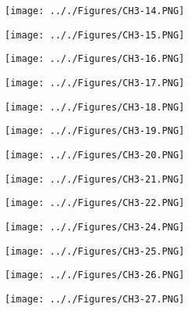 \documentclass[onecolumn,11pt]{report}
\def\lthtmlcheckvsize{\ifdim\ht\sizebox<\vsize 
  \ifdim\wd\sizebox<\hsize\expandafter\hfill\fi \expandafter\vfill
  \else\expandafter\vss\fi}%
\begin{document}
{\newpage\clearpage
{}%
\texttt{[image: .././Figures/CH3-14.PNG]}%
\lthtmlpictureZ
\lthtmlcheckvsize\clearpage}

{\newpage\clearpage
{}%
\texttt{[image: .././Figures/CH3-15.PNG]}%
\lthtmlpictureZ
\lthtmlcheckvsize\clearpage}

{\newpage\clearpage
{}%
\texttt{[image: .././Figures/CH3-16.PNG]}%
\lthtmlpictureZ
\lthtmlcheckvsize\clearpage}

{\newpage\clearpage
{}%
\texttt{[image: .././Figures/CH3-17.PNG]}%
\lthtmlpictureZ
\lthtmlcheckvsize\clearpage}

{\newpage\clearpage
{}%
\texttt{[image: .././Figures/CH3-18.PNG]}%
\lthtmlpictureZ
\lthtmlcheckvsize\clearpage}

{\newpage\clearpage
{}%
\texttt{[image: .././Figures/CH3-19.PNG]}%
\lthtmlpictureZ
\lthtmlcheckvsize\clearpage}

{\newpage\clearpage
{}%
\texttt{[image: .././Figures/CH3-20.PNG]}%
\lthtmlpictureZ
\lthtmlcheckvsize\clearpage}

{\newpage\clearpage
{}%
\texttt{[image: .././Figures/CH3-21.PNG]}%
\lthtmlpictureZ
\lthtmlcheckvsize\clearpage}

{\newpage\clearpage
{}%
\texttt{[image: .././Figures/CH3-22.PNG]}%
\lthtmlpictureZ
\lthtmlcheckvsize\clearpage}

{\newpage\clearpage
{}%
\texttt{[image: .././Figures/CH3-24.PNG]}%
\lthtmlpictureZ
\lthtmlcheckvsize\clearpage}

{\newpage\clearpage
{}%
\texttt{[image: .././Figures/CH3-25.PNG]}%
\lthtmlpictureZ
\lthtmlcheckvsize\clearpage}

{\newpage\clearpage
{}%
\texttt{[image: .././Figures/CH3-26.PNG]}%
\lthtmlpictureZ
\lthtmlcheckvsize\clearpage}

{\newpage\clearpage
{}%
\texttt{[image: .././Figures/CH3-27.PNG]}%
\lthtmlpictureZ
\lthtmlcheckvsize\clearpage}
\end{document}
